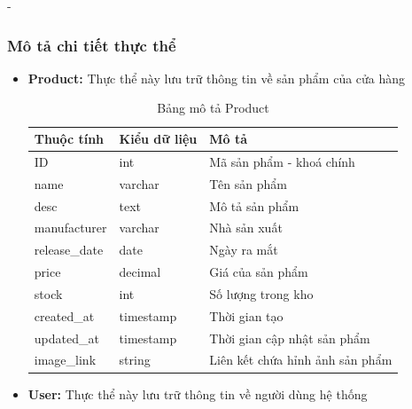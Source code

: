 \begin {list} {-}{}
\subsubsection {Mô tả chi tiết thực thể}
\begin{itemize}
    \item \textbf{Product:} Thực thể này lưu trữ thông tin về sản phẩm của cửa hàng
        \begin{table}[H]
        \begin{tabular}{|p{3cm}|p{3cm}|p{8cm}|}
        \hline
        \textbf{Thuộc tính} & \textbf{Kiểu dữ liệu} & \textbf{Mô tả}                            \\ \hline
        ID                  & int                   & Mã sản phẩm - khoá chính                  \\ \hline
        name                & varchar               & Tên sản phẩm                              \\ \hline
        desc                & text                  & Mô tả sản phẩm                            \\ \hline
        manufacturer        & varchar               & Nhà sản xuất                              \\ \hline
        release\_date       & date                  & Ngày ra mắt                               \\ \hline
        price               & decimal               & Giá của sản phẩm                          \\ \hline
        stock               & int                   & Số lượng trong kho                        \\ \hline
        created\_at         & timestamp             & Thời gian tạo                             \\ \hline
        updated\_at         & timestamp             & Thời gian cập nhật sản phẩm               \\ \hline
        image\_link         & string                & Liên kết chứa hỉnh ảnh sản phẩm           \\ \hline
        \end{tabular}
        \caption{Bảng mô tả Product}
        \label{table:1}
        \end{table}
    \item \textbf{User:} Thực thể này lưu trữ thông tin về người dùng hệ thống
            \begin{table}[H]
                \begin{tabular}{|p{3cm}|p{3cm}|p{8cm}|}

\end{tabular}
\end{table}
\end{itemize}
\end{list}
